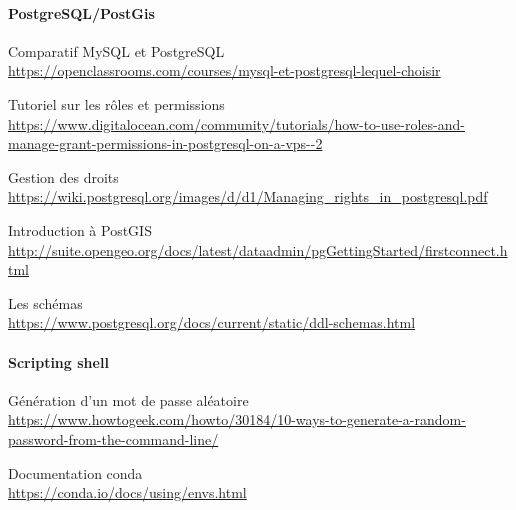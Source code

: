 
{

\small

\paragraph{PostgreSQL/PostGis}
\begin{description}

  \item Comparatif MySQL et PostgreSQL \\
  \url{https://openclassrooms.com/courses/mysql-et-postgresql-lequel-choisir}

  \item Tutoriel sur les rôles et permissions \\
  \url{https://www.digitalocean.com/community/tutorials/how-to-use-roles-and-manage-grant-permissions-in-postgresql-on-a-vps--2}

  \item Gestion des droits \\
  \url{https://wiki.postgresql.org/images/d/d1/Managing_rights_in_postgresql.pdf}

  \item Introduction à PostGIS \\
  \url{http://suite.opengeo.org/docs/latest/dataadmin/pgGettingStarted/firstconnect.html}

  \item Les schémas \\
  \url{https://www.postgresql.org/docs/current/static/ddl-schemas.html}

\end{description}





\paragraph{Scripting shell}
\begin{description}

  \item Génération d'un mot de passe aléatoire \\
  \url{https://www.howtogeek.com/howto/30184/10-ways-to-generate-a-random-password-from-the-command-line/}

  \item Documentation conda \\
  \url{https://conda.io/docs/using/envs.html}


\end{description}}
